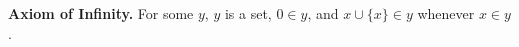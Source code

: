 \textbf{Axiom of Infinity.} For some $y$, $y$ is a set, $0 \in y$, and $x \cup \{x\} \in y$ whenever $x \in y$.
